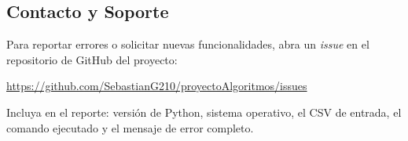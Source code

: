 \subsection{Contacto y Soporte}

Para reportar errores o solicitar nuevas funcionalidades, abra un \textit{issue} en el repositorio de GitHub del proyecto:

\begin{center}
\url{https://github.com/SebastianG210/proyectoAlgoritmos/issues}
\end{center}

\begin{nota}
Incluya en el reporte: versión de Python, sistema operativo, el CSV de entrada, el comando ejecutado y el mensaje de error completo.
\end{nota}
